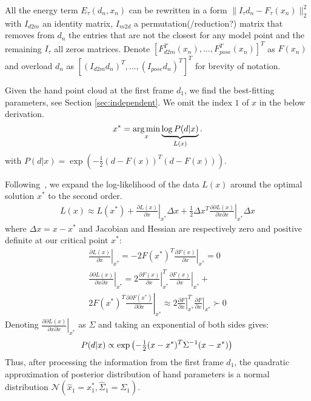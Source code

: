 All the energy term $E_{\tau}(d_n, x_n)$ can be rewritten in a form $\|I_{\tau} d_n - F_{\tau} (x_n)\|_2^2$ with $I_{d2m}$ an identity matrix, $I_{m2d}$ a permutation(/reduction?) matrix that removes from $d_n$ the entries that are not the closest for any model point and the remaining $I_{\tau}$ all zeros matrices. 
Denote $\left[F_{d2m}^T(x_n), ..., F_{pose}^T(x_n)\right]^T$ as $F(x_n)$ and overload $d_n$ as  $\left[(I_{d2m} d_n)^T, ..., (I_{pose} d_n)^T\right]^T$  for brevity of notation.

Given the hand point cloud at the first frame $d_1$, we find the best-fitting parameters, see Section \ref{sec:independent}.  We omit the index $1$ of $x$ in the below derivation.
\begin{equation}
x^* = \operatorname*{arg\,min}_{x} \underbrace{\log  P(d|x)}_{L(x)} \label{eq:independent}. 
\end{equation}
%
with $P(d|x) = \exp \left( - \tfrac{1}{2}(d - F(x))^T (d - F(x)) \right)$.

Following~, we expand the log-likelihood of the data $L(x)$ around the optimal solution $x^*$ to the second order.
%
\begin{align}
L(x) \approx L(x^*)   
+ \left. \tfrac{\partial L(x) }{\partial x}\right|_{x^*}  \Delta x 
+ \left. \tfrac{1}{2} \Delta x^T\tfrac{\partial \partial L(x)}{\partial x \partial x} \right|_{x^*} \Delta x 
\end{align}
%
where $\Delta x=x - x^*$ and Jacobian and Hessian are respectively zero and positive definite at our critical point $x^*$:
%
\begin{align*}
\left.\tfrac{\partial L(x)}{\partial x} \right|_{x^*} = - 2 F(x^*)^T 
\left.\tfrac{\partial F(x)}{\partial x}\right|_{x^*} = 0 
\\
\left. \tfrac{\partial \partial L(x)}{\partial x \partial x}  \right|_{x^*}  = 
2 \left.\tfrac{\partial F(x)}{\partial x}\right|_{x^*}^T 
\left.\tfrac{\partial F(x)}{\partial x}\right|_{x^*} + \\
2 F(x^*)^T  \left. \tfrac{\partial \partial F (x^*) }{\partial \partial x} \right|_{x^*}
\approx 2
\left.\tfrac{\partial F}{\partial x}\right|_{x^*}^T  
\left.\tfrac{\partial F}{\partial x}\right|_{x^*}
\succ 0
\end{align*}
% 
Denoting $\left. \tfrac{\partial \partial L(x)}{\partial x \partial x}  \right|_{x^*}  $ as $\Sigma$ and taking an exponential of both sides gives:
%
\begin{equation}
P(d|x) \propto \exp\left(- \tfrac{1}{2}(x - x^*)^T \Sigma^{-1}  (x - x^*) \right)\\
\end{equation}
% 
Thus, after processing the information from the first frame $d_1$, the quadratic approximation of posterior distribution of hand parameters is a normal distribution $\mathcal{N}\left(\hat{x}_1 = x_1^*,  \hat{\Sigma}_1 = \Sigma_1 \right)$.
%

